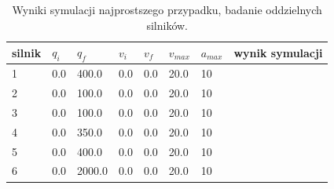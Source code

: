 \documentclass[a4paper, 12pt]{article}
\begin{document}
	\begin{table}[H]
	\centering
	\begin{tabular}{|m{2.5em}|m{4em}|m{4em}|m{4em}|m{4em}|m{4em}|m{4em}|m{5em}|}
	\hline
	silnik&$ q_i $ & $ q_f $ & $ v_i $ & $ v_f $ & $ v_{max} $ & $ a_{max} $&wynik symulacji\\
	\hline
	\hline
	\hspace{1em}1& 0.0 & 400.0 & 0.0 & 0.0 & 20.0 & 10&\hspace{2em}\checkmark\\ %
	\hline
	\hspace{1em}2& 0.0 & 100.0 & 0.0 & 0.0 & 20.0 & 10&\hspace{2em}\checkmark\\  %
	\hline
	\hspace{1em}3& 0.0 & 100.0 & 0.0 & 0.0 & 20.0 & 10&\hspace{2em}\checkmark\\ %
	\hline
	\hspace{1em}4& 0.0 & 350.0 & 0.0 & 0.0 & 20.0 & 10&\hspace{2em}\checkmark\\  %
	\hline
	\hspace{1em}5& 0.0 & 400.0 & 0.0 & 0.0 & 20.0 & 10&\hspace{2em}\checkmark\\  %
	\hline
	\hspace{1em}6& 0.0 & 2000.0 & 0.0 & 0.0 & 20.0 & 10&\hspace{2em}\checkmark\\  %
	\hline
	\end{tabular}
	\caption{Wyniki symulacji najprostszego przypadku, badanie oddzielnych silników.}
	\label{tab:setup9}
	\end{table}
	
\end{document}
